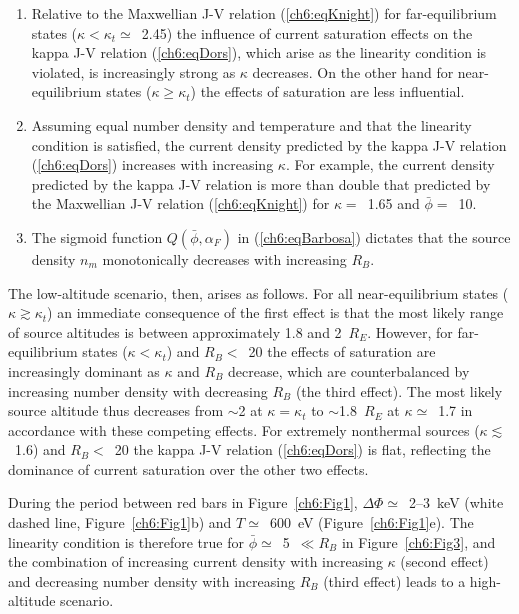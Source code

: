   \begin{enumerate}
  \item Relative to the Maxwellian J-V relation (\ref{ch6:eqKnight}) for
    far-equilibrium states ($\kappa < \kappa_t \simeq$~2.45) the influence of
    current saturation effects on the kappa J-V relation (\ref{ch6:eqDors}),
    which arise as the linearity condition is violated, is increasingly strong
    as $\kappa$ decreases. On the other hand for near-equilibrium states
    ($\kappa \geq \kappa_t$) the effects of saturation are less influential.
  \item Assuming equal number density and temperature and that the linearity
    condition is satisfied, the current density predicted by the kappa J-V
    relation (\ref{ch6:eqDors}) increases with increasing $\kappa$. For example,
    the current density predicted by the kappa J-V relation is more than double
    that predicted by the Maxwellian J-V relation (\ref{ch6:eqKnight}) for
    $\kappa =$~1.65 and $\bar{\phi} =$~10.
  \item The sigmoid function $Q (\bar{\phi}, \alpha_F)$ in (\ref{ch6:eqBarbosa})
    dictates that the source density $n_m$ monotonically decreases with
    increasing $R_B$.
  \end{enumerate}

  The low-altitude scenario, then, arises as follows. For all near-equilibrium
  states ($\kappa \gtrsim \kappa_t$) an immediate consequence of the first
  effect is that the most likely range of source altitudes is between
  approximately 1.8 and 2~$R_E$. However, for far-equilibrium states
  ($\kappa < \kappa_t$) and $R_B <$~20 the effects of saturation are
  increasingly dominant as $\kappa$ and $R_B$ decrease, which are
  counterbalanced by increasing number density with decreasing $R_B$ (the third
  effect). The most likely source altitude thus decreases from $\sim$2 at
  $\kappa = \kappa_t$ to $\sim$1.8~$R_E$ at $\kappa \simeq$~1.7 in accordance
  with these competing effects. For extremely nonthermal sources
  ($\kappa \lesssim$~1.6) and $R_B <$~20 the kappa J-V relation
  (\ref{ch6:eqDors}) is flat, reflecting the dominance of current saturation
  over the other two effects.

  During the period between red bars in Figure~\ref{ch6:Fig1},
  $\Delta \Phi \simeq$~2--3~keV (white dashed line, Figure~\ref{ch6:Fig1}b) and
  $T \simeq$~600~eV (Figure~\ref{ch6:Fig1}e). The linearity condition is
  therefore true for $\bar{\phi} \simeq$~5~$\ll R_B$ in Figure~\ref{ch6:Fig3},
  and the combination of increasing current density with increasing $\kappa$
  (second effect) and decreasing number density with increasing $R_B$ (third
  effect) leads to a high-altitude scenario.

